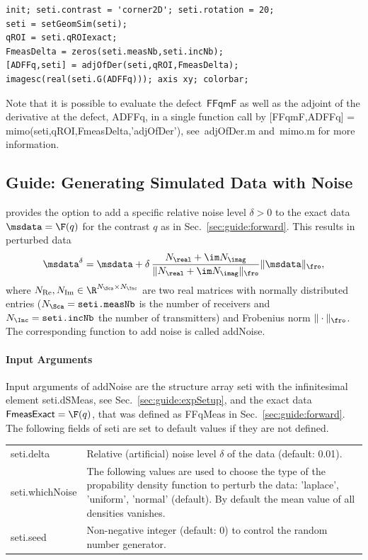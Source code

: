 \documentclass[a4paper]{article}
\begin{document}
\begin{lstlisting}[caption={Compute the adjoint of the derivative at the defect (\emph{source code}: \textsf{guides/guideAdjOfDer.m}).},label=lst:guideAdjOfDer]
init; seti.contrast = 'corner2D'; seti.rotation = 20;
seti = setGeomSim(seti);
qROI = seti.qROIexact;
FmeasDelta = zeros(seti.measNb,seti.incNb);
[ADFFq,seti] = adjOfDer(seti,qROI,FmeasDelta);
imagesc(real(seti.G(ADFFq))); axis xy; colorbar;
\end{lstlisting}

Note that it is possible to evaluate the defect~$\textsf{FFqmF}$ as well as the adjoint of the derivative at the defect, \textsf{ADFFq}, in a single function call by \textsf{[FFqmF,ADFFq] = mimo(seti,qROI,FmeasDelta,'adjOfDer')}, see~\textsf{adjOfDer.m} and~\textsf{mimo.m} for more information.


\subsection{Guide: Generating Simulated Data with Noise}\label{sec:guide:addNoise}

\IPscatt provides the option to add a specific relative noise level $\delta > 0$ to the exact data $\msdata = \F(q)$ for the contrast $q$ as in Sec.~\ref{sec:guide:forward}. This results in perturbed data
\[
\msdata^\delta = \msdata + \delta\, \frac{N_\real + \im N_\imag}{\|N_\real + \im N_\imag\|_\fro} \|\msdata\|_\fro,
\]
where $N_{\mathrm{Re}},N_{\mathrm{Im}} \in \R^{N_\Sca \times N_\Inc}$ are two real matrices with normally distributed entries ($N_\Sca = \texttt{seti.measNb}$ is the number of receivers and $N_\Inc = \texttt{seti.incNb}$ the number of transmitters) and Frobenius norm $\|\cdot\|_\fro$. The corresponding function to add noise is called \textsf{addNoise}.

\paragraph{Input Arguments} Input arguments of \textsf{addNoise} are the structure array \textsf{seti} with the infinitesimal element \textsf{seti.dSMeas}, see Sec.~\ref{sec:guide:expSetup}, and the exact data $\textsf{FmeasExact} = \F(q)$, that was defined as \textsf{FFqMeas} in Sec.~\ref{sec:guide:forward}. The following fields of \textsf{seti} are set to default values if they are not defined.

\noindent\begin{tabular}[t]{p{2.2cm} p{13.4cm}}
\textsf{seti.delta} 	 & Relative (artificial) noise level $\delta$ of the data (default: 0.01).\\
\textsf{seti.whichNoise} & The following values are used to choose the type of the propability density function to perturb the data: \textsf{'laplace'}, \textsf{'uniform'}, \textsf{'normal'} (default). By default the mean value of all densities vanishes.\\
\textsf{seti.seed} 	 & Non-negative integer (default: 0) to control the random number generator.
\end{tabular}
\end{document}
